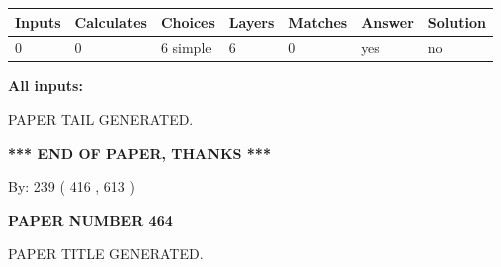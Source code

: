 \documentclass{ctexart}
\begin{document}
 
   
   
   
   
\noindent\begin{tabular}{|l|l|l|l|l|l|l|}
 \hline
Inputs & Calculates & Choices & Layers & Matches & Answer & Solution \\ \hline
 0  & 
 0  & 
 6
  simple  
  & 
 6  & 
 0  & 
  yes & 
  no 
  \\ \hline
 \end{tabular}
   
   
   
   
\noindent{}
   
   
   
   
\noindent\vspace{0.1in}\hspace{-0.08in} {\textbf{\Large{All inputs: }}}
   
   
   
   
   
   
 \vspace{0.2in}
 
   
   
\vspace{2.0in} PAPER TAIL GENERATED.
   
   
   
   
\vspace{1.0in} 
{\textbf{\large{ *** END OF PAPER, THANKS *** }}} 
   
   
\hspace{1.0in} By: 
 239 ( 416 ,  613 )
   
   
   
   
\newpage 
\setcounter{page}{ 
   464001 } 
   
   
   
   
 {\textbf{ \Large{ PAPER NUMBER  464  }}}
   
   
\vspace{0.2in}
   
   
   
   
   
   
   
   
 \vspace{0.2in}
 
 
 
 
   
   
 PAPER TITLE GENERATED.
   
\end{document}
